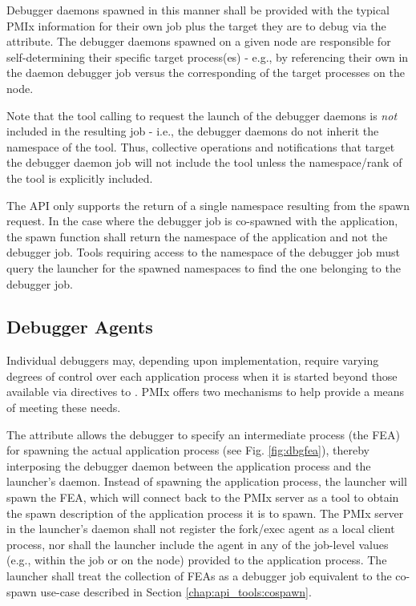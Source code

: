 Debugger daemons spawned in this manner shall be provided with the typical
\ac{PMIx} information for their own job plus the target they are to debug via
the  attribute. The debugger daemons spawned on a
given node are responsible for self-determining their specific target
process(es) - e.g., by referencing their own  in the
daemon debugger job versus the corresponding  of the
target processes on the node.

\adviceuserstart
Note that the tool calling  to request the launch of the debugger daemons is \emph{not} included in the resulting job - i.e., the debugger daemons do not inherit the namespace of the tool. Thus, collective operations and notifications that target the debugger daemon job will not include the tool unless the namespace/rank of the tool is explicitly included.

The  \ac{API} only supports the return of a single namespace resulting from the spawn request. In the case where the debugger job is co-spawned with the application, the spawn function shall return the namespace of the application and not the debugger job. Tools requiring access to the namespace of the debugger job must query the launcher for the spawned namespaces to find the one belonging to the debugger job.
\adviceuserend

\subsection{Debugger Agents}
\label{api:tools:debugger:agent}

Individual debuggers may, depending upon implementation, require varying degrees of control over each application process when it is started beyond those available via directives to . \ac{PMIx} offers two mechanisms to help provide a means of meeting these needs.

The  attribute allows the debugger to specify an intermediate process (the \ac{FEA}) for spawning the actual application process (see Fig. \ref{fig:dbgfea}), thereby interposing the debugger daemon between the application process and the launcher's daemon. Instead of spawning the application process, the launcher will spawn the \ac{FEA}, which will connect back to the \ac{PMIx} server as a tool to obtain the spawn description of the application process it is to spawn. The \ac{PMIx} server in the launcher's daemon shall not register the fork/exec agent as a local client process, nor shall the launcher include the agent in any of the job-level values (e.g.,  within the job or  on the node) provided to the application process. The launcher shall treat the collection of \acp{FEA} as a debugger job equivalent to the co-spawn use-case described in Section \ref{chap:api_tools:cospawn}.

